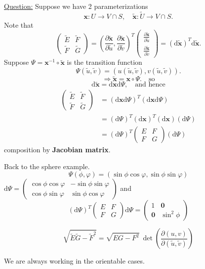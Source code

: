 \documentclass{article}
\begin{document}
\noindent \underline{Question:}
Suppose we have 2 parameterizations
\[
\mathbf{x}: U \to V \cap S, \quad \mathbf{\tilde{x}}: \tilde{U} \to V \cap S.
\]
Note that
\[
\begin{pmatrix} \tilde{E} & \tilde{F} \\ \tilde{F} & \tilde{G} \end{pmatrix} = \left( \frac{\partial \mathbf{\tilde{x}}}{\partial \tilde{u}}, \frac{\partial \mathbf{\tilde{x}}}{\partial \tilde{v}} \right)^T \begin{pmatrix} \frac{\partial \mathbf{\tilde{x}}}{\partial \tilde{u}} \\ \frac{\partial \mathbf{\tilde{x}}}{\partial \tilde{v}} \end{pmatrix}
= (\mathrm{d}\mathbf{\tilde{x}})^T \mathrm{d}\mathbf{\tilde{x}}.
\]
Suppose $\Psi = \mathbf{x}^{-1} \circ \mathbf{\tilde{x}}$ is the transition function
\[
\Psi(\tilde{u}, \tilde{v}) = (u(\tilde{u}, \tilde{v}), v(\tilde{u}, \tilde{v})).
\]
\[
\Rightarrow \mathbf{\tilde{x}} = \mathbf{x} \circ \Psi. \quad \text{so}
\]
\[
\mathrm{d}\mathbf{\tilde{x}} = \mathrm{d}\mathbf{x} \mathrm{d}\Psi, \quad \text{and hence}
\]
\begin{align*}
\begin{pmatrix} \tilde{E} & \tilde{F} \\ \tilde{F} & \tilde{G} \end{pmatrix} &= (\mathrm{d}\mathbf{x} \mathrm{d}\Psi)^T (\mathrm{d}\mathbf{x} \mathrm{d}\Psi) \\
&= (\mathrm{d}\Psi)^T (\mathrm{d}\mathbf{x})^T (\mathrm{d}\mathbf{x}) (\mathrm{d}\Psi) \\
&= (\mathrm{d}\Psi)^T \begin{pmatrix} E & F \\ F & G \end{pmatrix} (\mathrm{d}\Psi)
\end{align*}
composition by \textbf{Jacobian matrix}.

\begin{example} Back to the sphere example.
\[
\Psi(\phi, \varphi) = (\sin \phi \cos \varphi, \sin \phi \sin \varphi)
\]
$\mathrm{d}\Psi = \begin{pmatrix}
\cos\phi \cos\varphi & -\sin\phi \sin\varphi \\
\cos\phi \sin\varphi & \sin\phi \cos\varphi
\end{pmatrix}$
and
\[
(\mathrm{d}\Psi)^T \begin{pmatrix} E & F \\ F & G \end{pmatrix} \mathrm{d}\Psi = \begin{pmatrix} 1 & \mathbf{0} \\ \mathbf{0} & \sin^2 \phi \end{pmatrix}
\]
\end{example}

\begin{corollary}
\[
\sqrt{\tilde{E}\tilde{G}-\tilde{F}^2} = \sqrt{EG-F^2} \ \det \left( \frac{\partial (u, v)}{\partial (\tilde{u}, \tilde{v})} \right)
\]
\begin{remark}
    We are always working in the orientable cases.
\end{remark}
\end{corollary}
\end{document}
